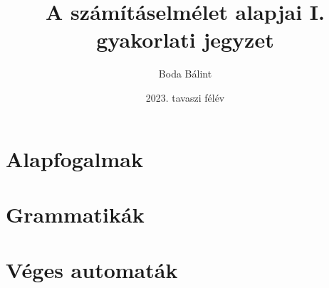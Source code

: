 \documentclass[a4paper,12pt]{report}
\title{\huge{A számításelmélet alapjai I.} \\[-4pt] \large gyakorlati jegyzet \vspace{-15pt}}
\author{Boda Bálint}
\date{\vspace{-12pt}2023. tavaszi félév}
\theoremstyle{definition}
\begin{document}
	\maketitle
	\vspace{-10pt}
	\tableofcontents
	\chapter{Alapfogalmak}
	
	\chapter{Grammatikák}
	
	\chapter{Véges automaták}
	
\end{document}
